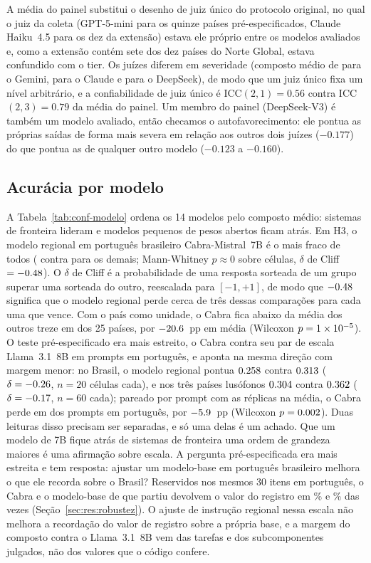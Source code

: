 A média do painel substitui o desenho de juiz único do protocolo original, no
qual o juiz da coleta (GPT-5-mini para os quinze países pré-especificados,
Claude Haiku~4.5 para os dez da extensão) estava ele próprio entre os modelos
avaliados e, como a extensão contém sete dos dez países do Norte Global, estava
confundido com o tier. Os juízes diferem em severidade (composto médio de
\njudgegemini{} para o Gemini, \njudgeclaude{} para o Claude e
\njudgedeepseek{} para o DeepSeek), de modo que um juiz único fixa um nível
arbitrário, e a confiabilidade de juiz único é ICC$(2,1)=0.56$ contra
ICC$(2,3)=0.79$ da média do painel. Um membro do painel (DeepSeek-V3) é também
um modelo avaliado, então checamos o autofavorecimento: ele pontua as próprias
saídas de forma mais severa em relação aos outros dois juízes ($-0.177$) do que
pontua as de qualquer outro modelo ($-0.123$ a $-0.160$).

\subsection{Acurácia por modelo}
\label{sec:res:modelo}

A Tabela~\ref{tab:conf-modelo} ordena os 14 modelos pelo composto médio:
sistemas de fronteira lideram e modelos pequenos de pesos abertos ficam atrás.
Em H3, o modelo regional em português brasileiro Cabra-Mistral~7B é o mais
fraco de todos (\ncabra{} contra \nrestmean{} para os demais; Mann-Whitney
$p\approx 0$ sobre células, $\delta$ de Cliff $=-0.48$). O $\delta$ de
Cliff é a probabilidade de uma resposta sorteada de um grupo superar uma
sorteada do outro, reescalada para $[-1,+1]$, de modo que $-0.48$ significa
que o modelo regional perde cerca de três dessas comparações para cada uma que
vence. Com o país como unidade, o Cabra fica abaixo da média dos outros treze em
\nhthreebyctryneg{} dos 25 países, por $-20.6$~pp em média (Wilcoxon
$p=1\times10^{-5}$). O teste pré-especificado era mais estreito, o Cabra contra
seu par de escala Llama~3.1~8B em prompts em português, e aponta na mesma
direção com margem menor: no Brasil, o modelo regional pontua $0.258$
contra $0.313$ ($\delta=-0.26$, $n=20$ células cada), e
nos três países lusófonos $0.304$ contra $0.362$
($\delta=-0.17$, $n=60$ cada); pareado por prompt com as réplicas na
média, o Cabra perde em \nhthreenarrowneg{} dos \nhthreenarrown{} prompts em
português, por $-5.9$~pp (Wilcoxon $p=0.002$). Duas leituras disso precisam ser separadas, e só uma delas é um achado. Que um
modelo de 7B fique atrás de sistemas de fronteira uma ordem de grandeza maiores
é uma afirmação sobre escala. A pergunta pré-especificada era mais estreita e
tem resposta: ajustar um modelo-base em português brasileiro melhora o que ele
recorda sobre o Brasil? Reservidos nos mesmos 30 itens em português, o Cabra e o
modelo-base de que partiu devolvem o valor do registro em \ncabsanitycabra\% e
\ncabsanitybase\% das vezes (Seção~\ref{sec:res:robustez}). O ajuste de
instrução regional nessa escala não melhora a recordação do valor de registro
sobre a própria base, e a margem do composto contra o Llama~3.1~8B vem das
tarefas e dos subcomponentes julgados, não dos valores que o código confere.

